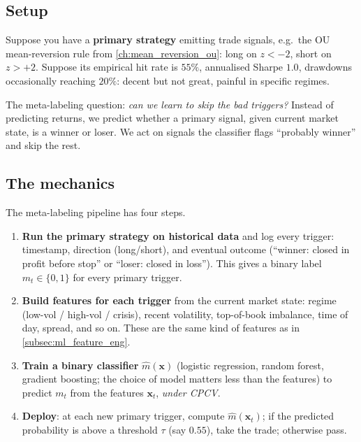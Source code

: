 \subsection{Setup}
\label{subsec:ml_meta_setup}

Suppose you have a \textbf{primary strategy} emitting trade
signals, e.g.\ the OU mean-reversion rule from
\cref{ch:mean_reversion_ou}: long on $z < -2$, short on $z > +2$.
Suppose its empirical hit rate is $55\%$, annualised Sharpe $1.0$,
drawdowns occasionally reaching $20\%$: decent but not great,
painful in specific regimes.

The meta-labeling question: \emph{can we learn to skip the bad
triggers?} Instead of predicting returns, we predict whether a
primary signal, given current market state, is a winner or loser.
We act on signals the classifier flags ``probably winner'' and
skip the rest.

\subsection{The mechanics}
\label{subsec:ml_meta_mechanics}

The meta-labeling pipeline has four steps.

\begin{enumerate}
  \item \textbf{Run the primary strategy on historical data}
  and log every trigger: timestamp, direction (long/short),
  and eventual outcome (``winner: closed in profit before
  stop'' or ``loser: closed in loss''). This gives a binary
  label $m_t \in \{0, 1\}$ for every primary trigger.
  \item \textbf{Build features for each trigger} from the
  current market state: regime (low-vol / high-vol /
  crisis), recent volatility, top-of-book imbalance, time
  of day, spread, and so on. These are the same kind of
  features as in \cref{subsec:ml_feature_eng}.
  \item \textbf{Train a binary classifier}
  $\hat m(\mathbf{x})$ (logistic regression, random forest,
  gradient boosting; the choice of model matters less
  than the features) to predict $m_t$ from the features
  $\mathbf{x}_t$, \emph{under CPCV}.
  \item \textbf{Deploy}: at each new primary trigger, compute
  $\hat m(\mathbf{x}_t)$; if the predicted probability is
  above a threshold $\tau$ (say $0.55$), take the trade;
  otherwise pass.
\end{enumerate}

